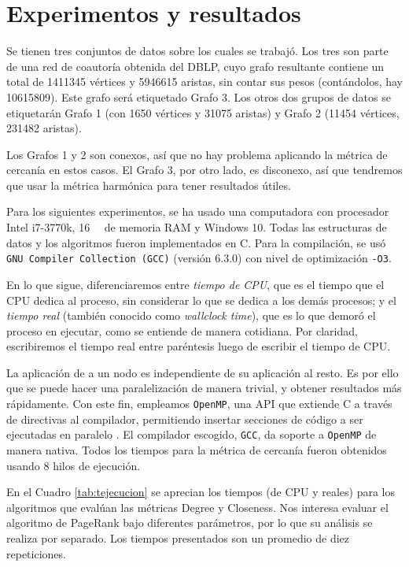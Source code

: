 \documentclass[journal]{IEEEtran}
\newcommand{\pkg}[1]{\texttt{#1}}
\begin{document}
\section{Experimentos y resultados}
Se tienen tres conjuntos de datos sobre los cuales se trabajó. Los tres son parte de una red de coautoría obtenida del DBLP, cuyo grafo resultante contiene un total de \num{1411345} vértices y \num{5946615} aristas, sin contar sus pesos (contándolos, hay \num{10615809}). Este grafo será etiquetado Grafo 3. Los otros dos grupos de datos se etiquetarán Grafo 1 (con \num{1650} vértices y \num{31075} aristas) y Grafo 2 (\num{11454} vértices, \num{231482} aristas). 

Los Grafos 1 y 2 son conexos, así que no hay problema aplicando la métrica de cercanía en estos casos. El Grafo 3, por otro lado, es disconexo, así que tendremos que usar la métrica harmónica para tener resultados útiles.

Para los siguientes experimentos, se ha usado una computadora con procesador Intel i7-3770k, \SI{16}{\giga\byte} de memoria RAM y Windows 10. Todas las estructuras de datos y los algoritmos fueron implementados en C. Para la compilación, se usó \pkg{GNU Compiler Collection (GCC)} (versión 6.3.0) con nivel de optimización \texttt{-O3}.

En lo que sigue, diferenciaremos entre \textit{tiempo de CPU}, que es el tiempo que el CPU dedica al proceso, sin considerar lo que se dedica a los demás procesos; y el \textit{tiempo real} (también conocido como \textit{wallclock time}), que es lo que demoró el proceso en ejecutar, como se entiende de manera cotidiana. Por claridad, escribiremos el tiempo real entre paréntesis luego de escribir el tiempo de CPU.

La aplicación de  a un nodo es independiente de su aplicación al resto. Es por ello que se puede hacer una paralelización de manera trivial, y obtener resultados más rápidamente. Con este fin, empleamos \pkg{OpenMP}, una API que extiende C a través de directivas al compilador, permitiendo insertar secciones de código a ser ejecutadas en paralelo \cite{openmp}. El compilador escogido, \pkg{GCC}, da soporte a \pkg{OpenMP} de manera nativa. Todos los tiempos para la métrica de cercanía fueron obtenidos usando 8 hilos de ejecución.

En el Cuadro \ref{tab:tejecucion} se aprecian los tiempos (de CPU y reales) para los algoritmos que evalúan las métricas Degree y Closeness. Nos interesa evaluar el algoritmo de PageRank bajo diferentes parámetros, por lo que su análisis se realiza por separado. Los tiempos presentados son un promedio de diez repeticiones.
\end{document}
